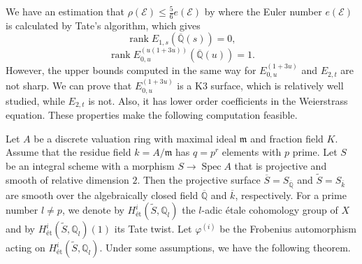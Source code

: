\documentclass[a4paper]{jarticle} %
\theoremstyle{definition}
\newtheorem{thm}{Theorem}[section]
\theoremstyle{remark}
\DeclareMathOperator{\rank}{rank}
\DeclareMathOperator{\NS}{NS}
\DeclareMathOperator{\Spec}{Spec}
\begin{document}
We have an estimation that $\rho(\mathcal{E}) \leq \frac{5}{6} e(\mathcal{E})$ by \cite{ref:naskreckiphd} where the Euler number $e(\mathcal{E})$ is calculated by Tate's algorithm, which gives
\begin{equation*}
    \rank E_{1,s}(\overline{\mathbb{Q}}(s)) = 0,
\end{equation*}
\begin{equation*}
    \rank E_{0,u}^{(u(1 + 3u))}(\overline{\mathbb{Q}}(u)) = 1.
\end{equation*}
However, the upper bounds computed in the same way for $E_{0,u}^{(1 + 3u)}$ and $E_{2,t}$ are not sharp.
We can prove that $E_{0,u}^{(1 + 3u)}$ is a K3 surface, which is relatively well studied, while $E_{2,t}$ is not.
Also, it has lower order coefficients in the Weierstrass equation.
These properties make the following computation feasible.

Let $A$ be a discrete valuation ring with maximal ideal $\mathfrak{m}$ and fraction field $K$.
Assume that the residue field $k=A/\mathfrak{m}$ has $q=p^r$ elements with $p$ prime.
Let $S$ be an integral scheme with a morphism $S \to \Spec A$ that is projective and smooth of relative dimension $2$.
Then the projective surface $\overline{S}=S_{\overline{\mathbb{Q}}}$ and $\tilde{S}=S_{\overline{k}}$ are smooth over the algebraically closed field $\overline{\mathbb{Q}}$ and $\overline{k}$, respectively.
For a prime number $l \neq p$, we denote by $H_{\text{\'et}}^{i}(\tilde{S}, \mathbb{Q}_l)$ the $l$-adic \'etale cohomology group of $X$ and by $H_{\text{\'et}}^{i}(\tilde{S}, \mathbb{Q}_l)(1)$ its Tate twist.
Let $\varphi^{(i)}$ be the Frobenius automorphism acting on $H_{\text{\'et}}^{i}(\tilde{S}, \mathbb{Q}_l)$.
Under some assumptions, we have the following theorem.

\end{document}
